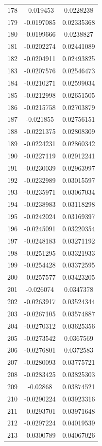 \documentclass[a4paper, 11pt, oneside]{report}
\begin{document}
{\begin{longtable}{|c|c|c|}
178 & -0.019453  & 0.0228238  \\
179 & -0.0197085 & 0.02335368 \\
180 & -0.0199666 & 0.0238827  \\
181 & -0.0202274 & 0.02441089 \\
182 & -0.0204911 & 0.02493825 \\
183 & -0.0207576 & 0.02546473 \\
184 & -0.0210271 & 0.02599034 \\
185 & -0.0212998 & 0.02651505 \\
186 & -0.0215758 & 0.02703879 \\
187 & -0.021855  & 0.02756151 \\
188 & -0.0221375 & 0.02808309 \\
189 & -0.0224231 & 0.02860342 \\
190 & -0.0227119 & 0.02912241 \\
191 & -0.0230039 & 0.02963997 \\
192 & -0.0232989 & 0.03015597 \\
193 & -0.0235971 & 0.03067034 \\
194 & -0.0238983 & 0.03118298 \\
195 & -0.0242024 & 0.03169397 \\
196 & -0.0245091 & 0.03220354 \\
197 & -0.0248183 & 0.03271192 \\
198 & -0.0251295 & 0.03321933 \\
199 & -0.0254428 & 0.03372595 \\
200 & -0.0257577 & 0.03423205 \\
201 & -0.026074  & 0.0347378  \\
202 & -0.0263917 & 0.03524344 \\
203 & -0.0267105 & 0.03574887 \\
204 & -0.0270312 & 0.03625356 \\
205 & -0.0273542 & 0.0367569  \\
206 & -0.0276801 & 0.0372583  \\
207 & -0.0280093 & 0.03775721 \\
208 & -0.0283425 & 0.03825303 \\
209 & -0.02868   & 0.03874521 \\
210 & -0.0290224 & 0.03923316 \\
211 & -0.0293701 & 0.03971648 \\
212 & -0.0297224 & 0.04019539 \\
213 & -0.0300789 & 0.04067026 \\

\end{longtable}}
\end{document}
